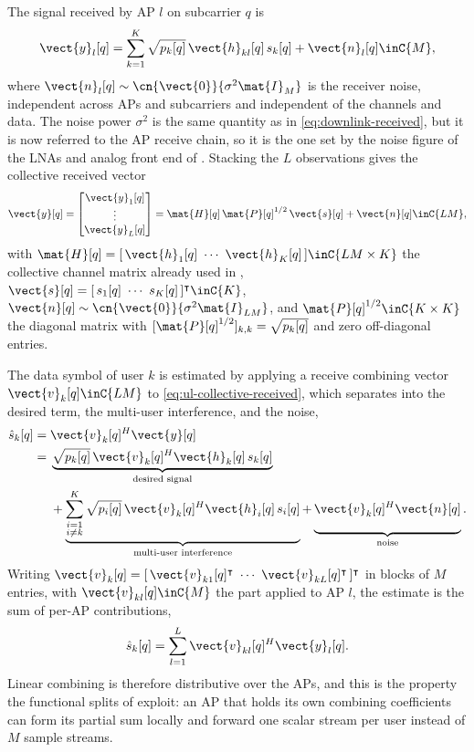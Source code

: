 The signal received by AP $l$ on subcarrier $q$ is
\begin{equation}
\label{eq:ul-ap-received}
\vect{y}_{l}[q] = \sum_{k=1}^{K} \sqrt{p_{k}[q]}\,\vect{h}_{kl}[q]\, s_{k}[q]
+ \vect{n}_{l}[q] \inC{M},
\end{equation}
where $\vect{n}_{l}[q]\sim\cn{\vect{0}}{\sigma^{2}\mat{I}_{M}}$ is the receiver
noise, independent across APs and subcarriers and independent of the channels and
data. The noise power $\sigma^{2}$ is the same quantity as in
\eqref{eq:downlink-received}, but it is now referred to the AP receive chain, so
it is the one set by the noise figure of the LNAs and analog front end of
. Stacking the $L$ observations gives the collective received vector
\begin{equation}
\label{eq:ul-collective-received}
\vect{y}[q] =
\begin{bmatrix} \vect{y}_{1}[q] \\ \vdots \\ \vect{y}_{L}[q] \end{bmatrix}
= \mat{H}[q]\,\mat{P}[q]^{1/2}\,\vect{s}[q] + \vect{n}[q] \inC{LM},
\end{equation}
with $\mat{H}[q]=[\,\vect{h}_{1}[q]\ \cdots\ \vect{h}_{K}[q]\,]\inC{LM\times K}$
the collective channel matrix already used in ,
$\vect{s}[q]=[\,s_{1}[q]\ \cdots\ s_{K}[q]\,]^{\intercal}\inC{K}$,
$\vect{n}[q]\sim\cn{\vect{0}}{\sigma^{2}\mat{I}_{LM}}$, and
$\mat{P}[q]^{1/2}\inC{K\times K}$ the diagonal matrix with
$[\mat{P}[q]^{1/2}]_{k,k}=\sqrt{p_{k}[q]}$ and zero off-diagonal entries.

The data symbol of user $k$ is estimated by applying a receive combining vector
$\vect{v}_{k}[q]\inC{LM}$ to \eqref{eq:ul-collective-received}, which separates
into the desired term, the multi-user interference, and the noise,
\begin{align}
\label{eq:ul-estimate}
\hat{s}_{k}[q] ={}& \vect{v}_{k}[q]^{H}\vect{y}[q] \nonumber\\
={}& \underbrace{\sqrt{p_{k}[q]}\,\vect{v}_{k}[q]^{H}\vect{h}_{k}[q]\, s_{k}[q]}
_{\text{desired signal}} \nonumber\\
&+ \underbrace{\sum_{\substack{i=1 \\ i\neq k}}^{K}
\sqrt{p_{i}[q]}\,\vect{v}_{k}[q]^{H}\vect{h}_{i}[q]\, s_{i}[q]}
_{\text{multi-user interference}}
+ \underbrace{\vphantom{\sum_{i=1}^{K}}\vect{v}_{k}[q]^{H}\vect{n}[q]}
_{\text{noise}} .
\end{align}
Writing $\vect{v}_{k}[q]=[\,\vect{v}_{k1}[q]^{\intercal}\ \cdots\
\vect{v}_{kL}[q]^{\intercal}\,]^{\intercal}$ in blocks of $M$ entries, with
$\vect{v}_{kl}[q]\inC{M}$ the part applied to AP $l$, the estimate is the sum of
per-AP contributions,
\begin{equation}
\label{eq:ul-distributive}
\hat{s}_{k}[q] = \sum_{l=1}^{L} \vect{v}_{kl}[q]^{H}\vect{y}_{l}[q].
\end{equation}
Linear combining is therefore distributive over the APs, and this is the property
the functional splits of \Cref{ssec:split} exploit: an AP that holds its own
combining coefficients can form its partial sum locally and forward one scalar
stream per user instead of $M$ sample streams.

